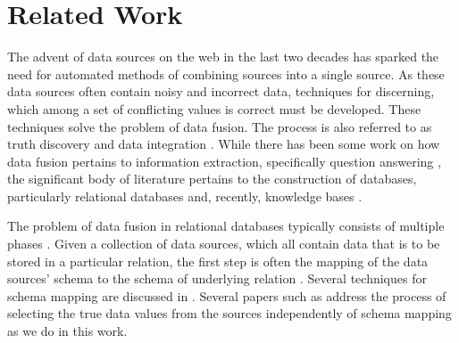 \documentclass{acm_proc_article-sp}
\begin{document}
\maketitle








\section{Related Work}
The advent of data sources on the web in the last two decades has sparked the need for automated methods of combining sources into a single source. As these data sources often contain noisy and incorrect data, techniques for discerning, which among a set of conflicting values is correct must be developed. These techniques solve the problem of data fusion. The process is also referred to as truth discovery \cite{waguih:truth} \cite{yin:truth} and data integration \cite{sarma:data} \cite{zhao:bayesian}. While there has been some work on how data fusion pertains to information extraction, specifically question answering \cite{wu:corroborating}, the significant body of literature pertains to the construction of databases, particularly relational databases and, recently, knowledge bases \cite{dong:data}. 



The problem of data fusion in relational databases typically consists of multiple phases \cite{bleiholder:data} \cite{li:truth}. Given a collection of data sources, which all contain data that is to be stored in a particular relation, the first step is often the mapping of the data sources' schema to the schema of underlying relation \cite{bleiholder:data}. Several techniques for schema mapping are discussed in \cite{naumann:data}. Several papers such as \cite{li:truth} address the process of selecting the true data values from the sources independently of schema mapping as we do in this work.
\end{document}
